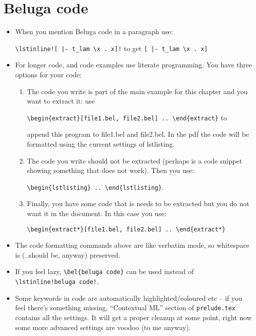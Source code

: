 \documentclass[12pt,draft]{article}
\newcounter{chapter}
\begin{document}
\section{Beluga code}
\begin{itemize}
\item When you mention Beluga code in a paragraph use:

  \verb#\lstinline![ |- t_lam \x . x]!# to get \lstinline![ |- t_lam \x . x]!
\item For longer code, and code examples use literate programming. You have three options for your code:
  \begin{enumerate}
  \item The code you write is part of the main example for this
    chapter and you want to extract it: use

    \verb#\begin{extract}[file1.bel, file2.bel] .. \end{extract}# to

    append this program to file1.bel and file2.bel. In the pdf the
    code will be formatted using the current settings of lstlisting.
  \item The code you write should not be extracted (perhaps is a code
    snippet showing something that does not work). Then you use:

    \verb#\begin{lstlisting} .. \end{lstlisting}#.
  \item Finally, you have some code that is needs to be extracted but
    you do not want it in the document. In this case you use:

    \verb#\begin{extract*}[file1.bel, file2.bel] .. \end{extract*}#
  \end{enumerate}
\item The code formatting commands above are like verbatim mode, so whitespace is (..should be, anyway) preserved.
\item If you feel lazy, \verb#\bel{beluga code}# can be used instead of \\
  \verb#\lstinline!beluga code!#.
\item Some keywords in \beluga code are automatically highlighted/coloured etc -- if you feel there's something missing, ``Contextual ML'' section of \verb#prelude.tex# contains all the settings. It will get a proper cleanup at some point, right now some more advanced settings are voodoo (to me anyway).
\end{itemize}
\end{document}
